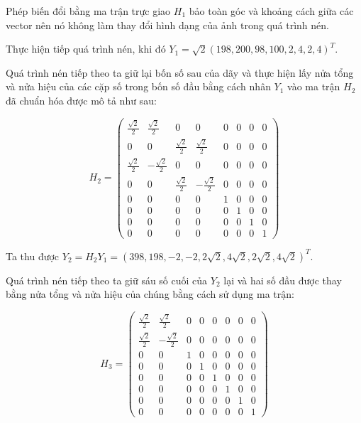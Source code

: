 Phép biến đổi bằng ma trận trực giao $H_1$ bảo toàn góc và khoảng cách giữa các vector nên  nó không làm thay đổi hình dạng của ảnh trong quá trình nén.

Thực hiện tiếp quá trình nén, khi đó $Y_{1} = \sqrt{2} (198, 200, 98, 100, 2, 4, 2, 4)^T$.

\noindent Quá trình nén tiếp theo ta giữ lại bốn số sau của dãy và thực hiện lấy nửa tổng và nửa hiệu của các cặp số trong bốn số đầu bằng cách nhân $Y_1$
vào ma trận $H_2$ đã chuẩn hóa được mô tả như sau:
\begin{center}
    $$H_2 = \begin{pmatrix}
        \frac{\sqrt{2}}{2} &  \frac{\sqrt{2}}{2} &  0 &  0 &  0 &  0 &  0 &  0 \\
        0 &  0 &  \frac{\sqrt{2}}{2} &  \frac{\sqrt{2}}{2} &  0 &  0 &  0 &  0 \\
        \frac{\sqrt{2}}{2} & -\frac{\sqrt{2}}{2} &  0 &  0 &  0 &  0 &  0 &  0 \\
        0 &  0 &  \frac{\sqrt{2}}{2} & -\frac{\sqrt{2}}{2} &  0 &  0 &  0 &  0 \\
        0 &  0 &  0 &  0 &  1 &  0 &  0 &  0 \\
        0 &  0 &  0 &  0 &  0 &  1 &  0 &  0 \\
        0 &  0 &  0 &  0 &  0 &  0 &  1 &  0 \\
        0 &  0 &  0 &  0 &  0 &  0 &  0 &  1
    \end{pmatrix}$$
\end{center}
Ta thu được $Y_{2} = H_2 Y_1 = (398, 198, -2, -2, 2\sqrt{2}, 4\sqrt{2}, 2\sqrt{2}, 4\sqrt{2})^T$.

Quá trình nén tiếp theo ta giữ sáu số cuối của $Y_{2}$ lại và hai số đầu được thay bằng nửa tổng và nửa hiệu của chúng bằng cách sử dụng ma trận:
\begin{center}
    $$H_3 = \begin{pmatrix}
        \frac{\sqrt{2}}{2} &  \frac{\sqrt{2}}{2} &  0 &  0 &  0 &  0 &  0 &  0 \\
        \frac{\sqrt{2}}{2} & -\frac{\sqrt{2}}{2} &  0 &  0 &  0 &  0 &  0 &  0 \\
        0 &  0 &  1 &  0 &  0 &  0 &  0 &  0 \\
        0 &  0 &  0 &  1 &  0 &  0 &  0 &  0 \\
        0 &  0 &  0 &  0 &  1 &  0 &  0 &  0 \\
        0 &  0 &  0 &  0 &  0 &  1 &  0 &  0 \\
        0 &  0 &  0 &  0 &  0 &  0 &  1 &  0 \\
        0 &  0 &  0 &  0 &  0 &  0 &  0 &  1
    \end{pmatrix}$$
\end{center}

